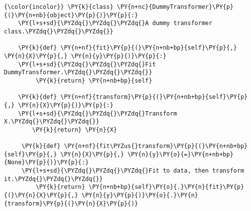 
\begin{Verbatim}[commandchars=\\\{\}]
{\color{incolor}} \PY{k}{class} \PY{n+nc}{DummyTransformer}\PY{p}{(}\PY{n+nb}{object}\PY{p}{)}\PY{p}{:}
    \PY{l+s+sd}{\PYZdq{}\PYZdq{}\PYZdq{}A dummy transformer class.\PYZdq{}\PYZdq{}\PYZdq{}}
    
    \PY{k}{def} \PY{n+nf}{fit}\PY{p}{(}\PY{n+nb+bp}{self}\PY{p}{,} \PY{n}{X}\PY{p}{,} \PY{n}{y}\PY{p}{)}\PY{p}{:}
    \PY{l+s+sd}{\PYZdq{}\PYZdq{}\PYZdq{}Fit DummyTransformer.\PYZdq{}\PYZdq{}\PYZdq{}}
         \PY{k}{return} \PY{n+nb+bp}{self}
             
    \PY{k}{def} \PY{n+nf}{transform}\PY{p}{(}\PY{n+nb+bp}{self}\PY{p}{,} \PY{n}{X}\PY{p}{)}\PY{p}{:}
    \PY{l+s+sd}{\PYZdq{}\PYZdq{}\PYZdq{}Transform X.\PYZdq{}\PYZdq{}\PYZdq{}}
        \PY{k}{return} \PY{n}{X}
                 
     \PY{k}{def} \PY{n+nf}{fit\PYZus{}transform}\PY{p}{(}\PY{n+nb+bp}{self}\PY{p}{,} \PY{n}{X}\PY{p}{,} \PY{n}{y}\PY{o}{=}\PY{n+nb+bp}{None}\PY{p}{)}\PY{p}{:}
     \PY{l+s+sd}{\PYZdq{}\PYZdq{}\PYZdq{}Fit to data, then transform it.\PYZdq{}\PYZdq{}\PYZdq{}}
         \PY{k}{return} \PY{n+nb+bp}{self}\PY{o}{.}\PY{n}{fit}\PY{p}{(}\PY{n}{X}\PY{p}{,} \PY{n}{y}\PY{p}{)}\PY{o}{.}\PY{n}{transform}\PY{p}{(}\PY{n}{X}\PY{p}{)}
\end{Verbatim}


%             
%             
%                 
